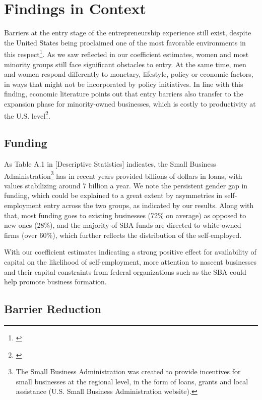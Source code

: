 \section{Findings in Context}

Barriers at the entry stage of the entrepreneurship experience still exist, despite the United States being proclaimed one of the most favorable environments in this respect\footnote{\cite{Autio2007}}. As we saw reflected in our coefficient estimates, women and most minority groups still face significant obstacles to entry. At the same time, men and women respond differently to monetary, lifestyle, policy or economic factors, in ways that might not be incorporated by policy initiatives. In line with this finding, economic literature points out that entry barriers also transfer to the expansion phase for minority-owned businesses, which is costly to productivity at the U.S. level\footnote{\cite{ReynoldsWhite1997}}. 

\subsection{Funding}

As Table A.1 in [Descriptive Statistics] indicates, the Small Business Administration\footnote{The Small Business Administration was created to provide incentives for small businesses at the regional level, in the form of loans, grants and local assistance (U.S. Small Business Administration website).} has in recent years provided billions of dollars in loans, with values stabilizing around 7 billion a year. We note the persistent gender gap in funding, which could be explained to a great extent by asymmetries in self-employment entry across the two groups, as indicated by our results. Along with that, most funding goes to existing businesses (72\% on average) as opposed to new ones (28\%), and the majority of SBA funds are directed to white-owned firms (over 60\%), which further reflects the distribution of the self-employed. 

With our coefficient estimates indicating a strong positive effect for availability of capital on the likelihood of self-employment, more attention to nascent businesses and their capital constraints from federal organizations such as the SBA could help promote business formation. 

\subsection{Barrier Reduction}

